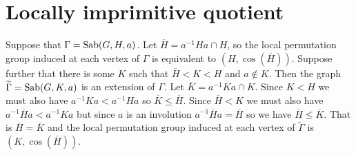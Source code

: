 





\section{Locally imprimitive quotient}

Suppose that $\Gamma = \operatorname{Sab}(G,H,a)$.
Let $\overline{H} = a^{-1}Ha \cap H$,
so the local permutation group induced at each vertex of $\Gamma$
is equivalent to $(H, \cos(\overline{H}))$.
Suppose further that there is some $K$ such that $\overline{H} < K < H$
and $a \not\in K$. Then the graph $\widetilde{\Gamma} = \operatorname{Sab}(G,K,a)$
is an extension of $\Gamma$.
Let $\overline{K} = a^{-1}Ka \cap K$.
Since $K < H$ we must also have $a^{-1}Ka < a^{-1}Ha$
so $\overline{K} \leq \overline{H}$.
Since $\overline{H} < K$ we must also have
$a^{-1}\overline{H}a < a^{-1}Ka$
but since $a$ is an involution $a^{-1}\overline{H}a = \overline{H}$
so we have $\overline{H} \leq \overline{K}$.
That is $\overline{H} = \overline{K}$
and the local permutation group induced at each vertex of
$\widetilde{\Gamma}$ is $(K, \cos(\overline{H}))$.


